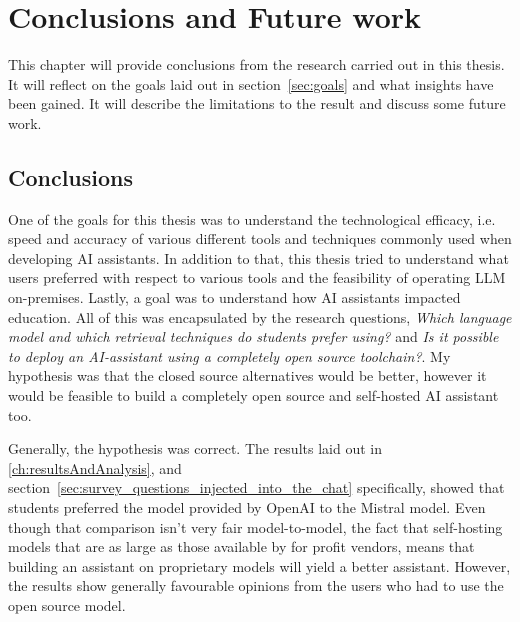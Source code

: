 ﻿\chapter{Conclusions and Future work}
\label{ch:conclusionsAndFutureWork}




This chapter will provide conclusions from the research carried out in this thesis. It will reflect on the goals laid out in section~\ref{sec:goals} and what insights have been gained. It will describe the limitations to the result and discuss some future work.


\section{Conclusions}
\label{sec:conclusions}




One of the goals for this thesis was to understand the technological efficacy, i.e. speed and accuracy of various different tools and techniques commonly used when developing AI assistants. In addition to that, this thesis tried to understand what users preferred with respect to various tools and the feasibility of operating \gls{LLM} on-premises. Lastly, a goal was to understand how AI assistants impacted education. All of this was encapsulated by the research questions, \textit{Which language model and which retrieval techniques do students prefer using?} and \textit{Is it possible to deploy an AI-assistant using a completely open source toolchain?}. My hypothesis was that the closed source alternatives would be better, however it would be feasible to build a completely open source and self-hosted AI assistant too.




Generally, the hypothesis was correct. The results laid out in \autoref{ch:resultsAndAnalysis}, and section~\ref{sec:survey_questions_injected_into_the_chat} specifically, showed that students preferred the model provided by OpenAI to the Mistral model. Even though that comparison isn’t very fair model-to-model, the fact that self-hosting models that are as large as those available by for profit vendors, means that building an assistant on proprietary models will yield a better assistant. However, the results show generally favourable opinions from the users who had to use the open source model.


